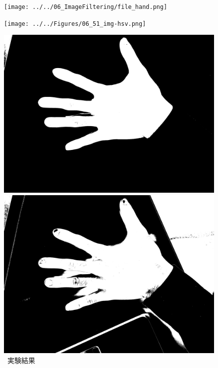 \begin{figure}[ht]
    \centering
    \begin{minipage}[b]{.23\textwidth}
        \centering
        \texttt{[image: ../../06\_ImageFiltering/file\_hand.png]}
    \end{minipage}
    \begin{minipage}[b]{.23\textwidth}
        \centering
        \texttt{[image: ../../Figures/06\_51\_img-hsv.png]}
    \end{minipage}
    \begin{minipage}[b]{.23\textwidth}
        \centering
        \includegraphics[keepaspectratio,width=\textwidth]{../../Figures/06_52_scd.png}
    \end{minipage}
    \begin{minipage}[b]{.23\textwidth}
        \includegraphics[keepaspectratio,width=\textwidth]{../../Figures/06_53_hand.png}
    \end{minipage}
    \caption{\kadaibe\ 実験結果}
\end{figure}
